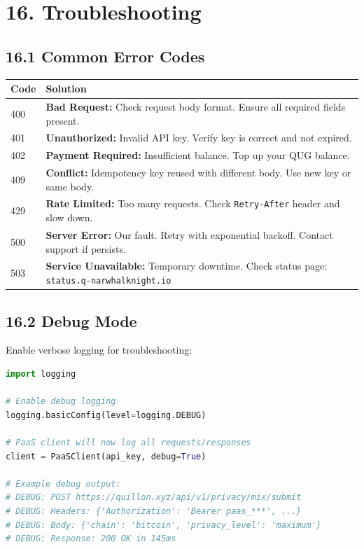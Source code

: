 \documentclass[11pt,a4paper]{article}
\begin{document}
\section{16. Troubleshooting}

\subsection{16.1 Common Error Codes}

\begin{longtable}{lp{10cm}}
\toprule
\textbf{Code} & \textbf{Solution} \\
\midrule
\endhead
400 & \textbf{Bad Request:} Check request body format. Ensure all required fields present. \\
401 & \textbf{Unauthorized:} Invalid API key. Verify key is correct and not expired. \\
402 & \textbf{Payment Required:} Insufficient balance. Top up your QUG balance. \\
409 & \textbf{Conflict:} Idempotency key reused with different body. Use new key or same body. \\
429 & \textbf{Rate Limited:} Too many requests. Check \texttt{Retry-After} header and slow down. \\
500 & \textbf{Server Error:} Our fault. Retry with exponential backoff. Contact support if persists. \\
503 & \textbf{Service Unavailable:} Temporary downtime. Check status page: \texttt{status.q-narwhalknight.io} \\
\bottomrule
\end{longtable}

\subsection{16.2 Debug Mode}

Enable verbose logging for troubleshooting:

\begin{lstlisting}[language=python]
import logging

# Enable debug logging
logging.basicConfig(level=logging.DEBUG)

# PaaS client will now log all requests/responses
client = PaaSClient(api_key, debug=True)

# Example debug output:
# DEBUG: POST https://quillon.xyz/api/v1/privacy/mix/submit
# DEBUG: Headers: {'Authorization': 'Bearer paas_***', ...}
# DEBUG: Body: {'chain': 'bitcoin', 'privacy_level': 'maximum'}
# DEBUG: Response: 200 OK in 145ms
\end{lstlisting}
\end{document}
